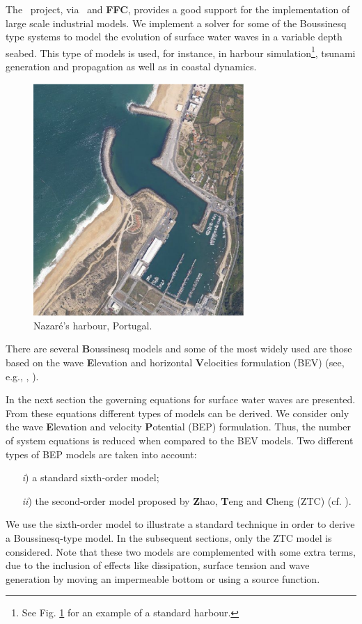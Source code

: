 The \fenics\, project, via \dolfin\, and \textbf{FFC}, provides a good
support for the implementation of large scale industrial models.  We
implement a solver for some of the Boussinesq type systems to model
the evolution of surface water waves in a variable
depth seabed.  This type of models is used, for instance, in harbour
simulation\footnote{See Fig. \ref{fig::harbour} for an example of a
standard harbour.}, tsunami generation and propagation as well as in
coastal dynamics.
\begin{figure}[!htb]
\centering
\includegraphics[width=8cm]{chapters/lopes/eps/nazare1.eps}
\caption{Nazar\'{e}'s harbour, Portugal.}\label{fig::harbour}
\end{figure}


There are several {\bf B}oussinesq models and some of the most widely
used are those based on the wave {\bf E}levation and horizontal {\bf
V}elocities formulation (BEV) (see, e.g., \cite{LiuWoo04},
\cite{WalMar02}).

In the next section the governing equations for surface water waves
are presented. From these equations different types of models can be
derived.  We consider only the wave {\bf E}levation and velocity {\bf
P}otential (BEP) formulation.  Thus, the number of system equations is
reduced when compared to the BEV models.  Two different types of BEP
models are taken into account:
\begin{itemize}
\item[{\it i})] a standard sixth-order model;
\item[{\it ii})] the second-order model proposed by {\bf Z}hao, {\bf T}eng
and {\bf C}heng (ZTC) (cf. \cite{ZhaTen04}).
\end{itemize}
We use the sixth-order model to  illustrate a standard
technique in order to  derive a  Boussinesq-type model.
In the subsequent sections, only the ZTC model is
considered.
Note  that these two models 
 are complemented with some extra terms, due to the
inclusion of effects like dissipation, surface tension and  wave
generation by moving an impermeable bottom or using a source function.
 
